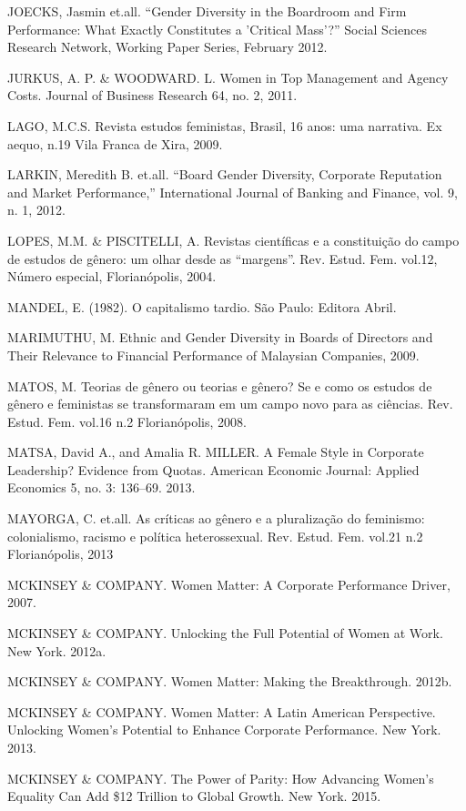\begin{Parskip}
JOECKS, Jasmin et.all. ``Gender Diversity in the Boardroom and Firm
Performance: What Exactly Constitutes a 'Critical Mass'?'' Social
Sciences Research Network, Working Paper Series, February 2012.

JURKUS, A. P. \& WOODWARD. L. Women in Top Management and Agency Costs.
Journal of Business Research 64, no. 2, 2011.

LAGO, M.C.S. Revista estudos feministas, Brasil, 16 anos: uma narrativa.
Ex aequo, n.19 Vila Franca de Xira, 2009.

LARKIN, Meredith B. et.all. ``Board Gender Diversity, Corporate
Reputation and Market Performance,'' International Journal of Banking
and Finance, vol. 9, n. 1, 2012.

LOPES, M.M. \& PISCITELLI, A. Revistas científicas e a constituição do
campo de estudos de gênero: um olhar desde as ``margens''. Rev. Estud.
Fem. vol.12, Número especial, Florianópolis, 2004.

MANDEL, E. (1982). O capitalismo tardio. São Paulo: Editora Abril.

MARIMUTHU, M. Ethnic and Gender Diversity in Boards of Directors and
Their Relevance to Financial Performance of Malaysian Companies, 2009.

MATOS, M. Teorias de gênero ou teorias e gênero? Se e como os estudos de
gênero e feministas se transformaram em um campo novo para as ciências.
Rev. Estud. Fem. vol.16 n.2 Florianópolis, 2008.

MATSA, David A., and Amalia R. MILLER. A Female Style in Corporate
Leadership? Evidence from Quotas. American Economic Journal: Applied
Economics 5, no. 3: 136--69. 2013.

MAYORGA, C. et.all. As críticas ao gênero e a pluralização do feminismo:
colonialismo, racismo e política heterossexual. Rev. Estud. Fem. vol.21
n.2 Florianópolis, 2013

MCKINSEY \& COMPANY. Women Matter: A Corporate Performance Driver, 2007.

MCKINSEY \& COMPANY. Unlocking the Full Potential of Women at Work. New
York. 2012a.

MCKINSEY \& COMPANY. Women Matter: Making the Breakthrough. 2012b.

MCKINSEY \& COMPANY. Women Matter: A Latin American Perspective.
Unlocking Women's Potential to Enhance Corporate Performance. New York.
2013.

MCKINSEY \& COMPANY. The Power of Parity: How Advancing Women's Equality
Can Add \$12 Trillion to Global Growth. New York. 2015.


\end{Parskip}

